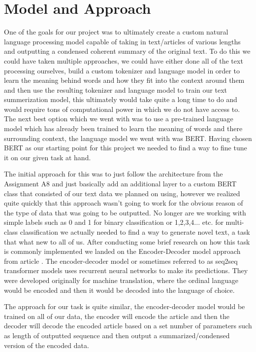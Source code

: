 \documentclass[twoside,twocolumn]{article}
\begin{document}

\section{Model and Approach}
One of the goals for our project was to ultimately create a custom natural language processing model capable of taking in text/articles of various lengths and outputting a condensed coherent summary of the original text. To do this we could have taken multiple approaches, we could have either done all of the text processing ourselves, build a custom tokenizer and language model in order to learn the meaning behind words and how they fit into the context around them and then use the resulting tokenizer and language model to train our text summerization model, this ultimately would take quite a long time to do and would require tons of computational power in which we do not have access to. The next best option which we went with was to use a pre-trained language model which has already been trained to learn the meaning of words and there surrounding context, the language model we went with was BERT. Having chosen BERT as our starting point for this project we needed to find a way to fine tune it on our given task at hand. 

The initial approach for this was to just follow the architecture from the Assignment A8 and just basically add an additional layer to a custom BERT class that consisted of our text data we planned on using, however we realized quite quickly that this approach wasn't going to work for the obvious reason of the type of data that was going to be outputted. No longer are we working with simple labels such as 0 and 1 for binary classification or 1,2,3,4... etc. for multi-class classification we actually needed to find a way to generate novel text, a task that what new to all of us. After conducting some brief research on how this task is commonly implemented we landed on the Encoder-Decoder model approach from article \cite{noauthor_leveraging_nodate}. The encoder-decoder model or sometimes referred to as seq2seq transformer models uses recurrent neural networks to make its predictions. They were developed originally for machine translation, where the ordinal language would be encoded and then it would be decoded into the language of choice. 

The approach for our task is quite similar, the encoder-decoder model would be trained on all of our data, the encoder will encode the article and then the decoder will decode the encoded article based on a set number of parameters such as length of outputted sequence and then output a summarized/condensed version of the encoded data. 
\end{document}
